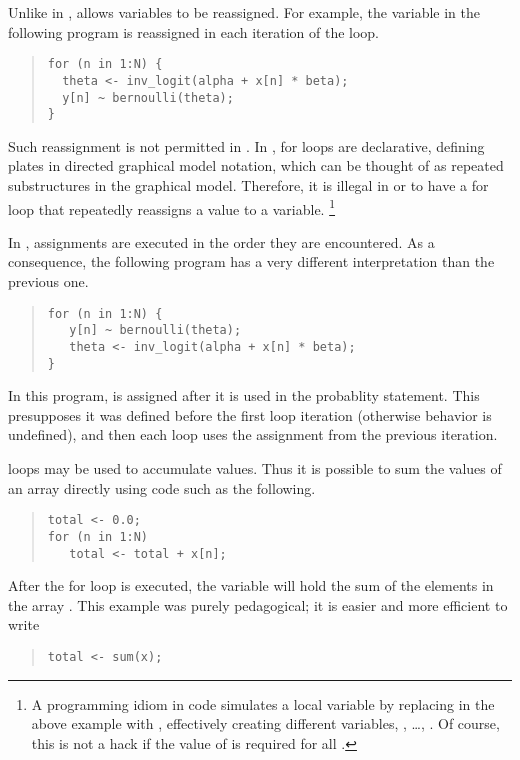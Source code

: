Unlike in \BUGS, \Stan allows variables to be reassigned.  For
example, the variable  in the following program is
reassigned in each iteration of the loop.
%
\begin{quote}
\begin{Verbatim} 
for (n in 1:N) {
  theta <- inv_logit(alpha + x[n] * beta);
  y[n] ~ bernoulli(theta);
}
\end{Verbatim}
\end{quote}
% 
Such reassignment is not permitted in \BUGS.  In \BUGS, for loops are
declarative, defining plates in directed graphical model notation,
which can be thought of as repeated substructures in the graphical
model.  Therefore, it is illegal in \BUGS or \JAGS to have a for loop
that repeatedly reassigns a value to a variable.%
%
\footnote{A programming idiom in \BUGS code simulates 
a local variable by replacing  in the above example with
, effectively creating  different variables,
, \ldots, .  Of course, this is not a
hack if the value of  is required for all .}

In \Stan, assignments are executed in the order they are encountered.
As a consequence, the following \Stan program has a very different
interpretation than the previous one.
%
\begin{quote}
\begin{Verbatim}
for (n in 1:N) {
   y[n] ~ bernoulli(theta);
   theta <- inv_logit(alpha + x[n] * beta);
}
\end{Verbatim}
\end{quote}
%
In this program,  is assigned after it is used in the
probablity statement.  This presupposes it was defined before the
first loop iteration (otherwise behavior is undefined), and then each
loop uses the assignment from the previous iteration. 

\Stan loops may be used to accumulate values.  Thus it is possible to
sum the values of an array directly using code such as the
following.
%
\begin{quote}
\begin{Verbatim}
total <- 0.0;
for (n in 1:N) 
   total <- total + x[n];
\end{Verbatim}
\end{quote}
%
After the for loop is executed, the variable  will hold
the sum of the elements in the array .  This example was
purely pedagogical; it is easier and more efficient to write
%
\begin{quote}
\begin{Verbatim}
total <- sum(x);
\end{Verbatim}
\end{quote}

